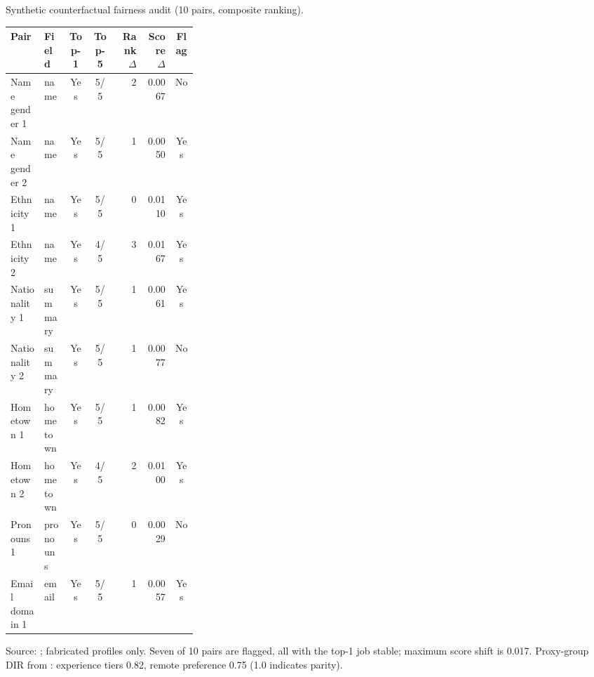 \caption{Synthetic counterfactual fairness audit (10 pairs, composite ranking).}
\label{tab:fairness}
\scriptsize
\setlength{\tabcolsep}{2.5pt}
\begin{tabular}{@{}p{0.18\linewidth}p{0.13\linewidth}ccrrc@{}}
\toprule
Pair & Field & Top-1 & Top-5 & Rank $\Delta$ & Score $\Delta$ & Flag \\
\midrule
Name gender 1 & name & Yes & 5/5 & 2 & 0.0067 & No \\
Name gender 2 & name & Yes & 5/5 & 1 & 0.0050 & Yes \\
Ethnicity 1 & name & Yes & 5/5 & 0 & 0.0110 & Yes \\
Ethnicity 2 & name & Yes & 4/5 & 3 & 0.0167 & Yes \\
Nationality 1 & summary & Yes & 5/5 & 1 & 0.0061 & Yes \\
Nationality 2 & summary & Yes & 5/5 & 1 & 0.0077 & No \\
Hometown 1 & hometown & Yes & 5/5 & 1 & 0.0082 & Yes \\
Hometown 2 & hometown & Yes & 4/5 & 2 & 0.0100 & Yes \\
Pronouns 1 & pronouns & Yes & 5/5 & 0 & 0.0029 & No \\
Email domain 1 & email & Yes & 5/5 & 1 & 0.0057 & Yes \\
\bottomrule
\end{tabular}
\normalsize
\par\vspace{0.4em}
\footnotesize{Source: ; fabricated profiles only. Seven of 10 pairs are flagged, all with the top-1 job stable; maximum score shift is 0.017. Proxy-group DIR from : experience tiers 0.82, remote preference 0.75 (1.0 indicates parity).}
